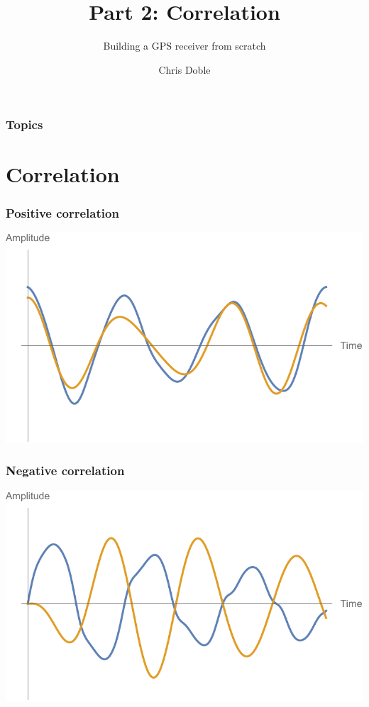 \documentclass[aspectratio=169]{beamer}
\author{Chris Doble}
\date{}
\subtitle{Building a GPS receiver from scratch}
\title{Part 2: Correlation}
\begin{document}
\frame{\titlepage}

\begin{frame}
    \frametitle{Topics}

    \tableofcontents
\end{frame}

\section{Correlation}

\begin{frame}
    \frametitle{Positive correlation}

    \centering
    \includegraphics[width=\textwidth * 3 / 4]{1 positive.pdf}
\end{frame}

\begin{frame}
    \frametitle{Negative correlation}

    \centering
    \includegraphics[width=\textwidth * 3 / 4]{2 negative.pdf}
\end{frame}
\end{document}
